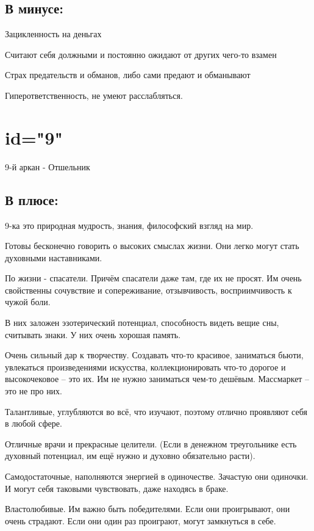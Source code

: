 \subsection{В минусе:}
\item Зацикленность на деньгах
\item Считают себя должными и постоянно ожидают от других чего-то взамен
\item Страх предательств и обманов, либо сами предают и обманывают
\item Гиперответственность, не умеют расслабляться.
\endsubsection

\endsection

\section{id="9"}{9-й аркан - Отшельник}

\subsection{В плюсе:}
\item 9-ка это природная мудрость, знания, философский взгляд на мир.
\item Готовы бесконечно говорить о высоких смыслах жизни. Они легко могут стать духовными наставниками.
\item По жизни - спасатели. Причём спасатели даже там, где их не просят. Им очень свойственны сочувствие и сопереживание, отзывчивость, восприимчивость к чужой боли.
\item В них заложен эзотерический потенциал, способность видеть вещие сны, считывать знаки. У них очень хорошая память.
\item Очень сильный дар к творчеству. Создавать что-то красивое, заниматься бьюти, увлекаться произведениями искусства, коллекционировать что-то дорогое и высокочековое – это их. Им не нужно заниматься чем-то дешёвым. Массмаркет – это не про них.
\item Талантливые, углубляются во всё, что изучают, поэтому отлично проявляют себя в любой сфере.
\item Отличные врачи и прекрасные целители. (Если в денежном треугольнике есть духовный потенциал, им ещё нужно и духовно обязательно расти).
\item Самодостаточные, наполняются энергией в одиночестве. Зачастую они одиночки. И могут себя таковыми чувствовать, даже находясь в браке.
\item Властолюбивые. Им важно быть победителями. Если они проигрывают, они очень страдают. Если они один раз проиграют, могут замкнуться в себе.
\endsubsection

